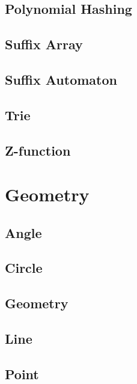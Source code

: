 \subsection{Polynomial Hashing}
\raggedbottom
\subsection{Suffix Array}
\raggedbottom
\subsection{Suffix Automaton}
\raggedbottom
\subsection{Trie}
\raggedbottom
\subsection{Z-function}
\raggedbottom

\hrulefill

\section{Geometry}
\subsection{Angle}
\raggedbottom
\subsection{Circle}
\raggedbottom
\subsection{Geometry}
\raggedbottom
\subsection{Line}
\raggedbottom
\subsection{Point}
\raggedbottom

